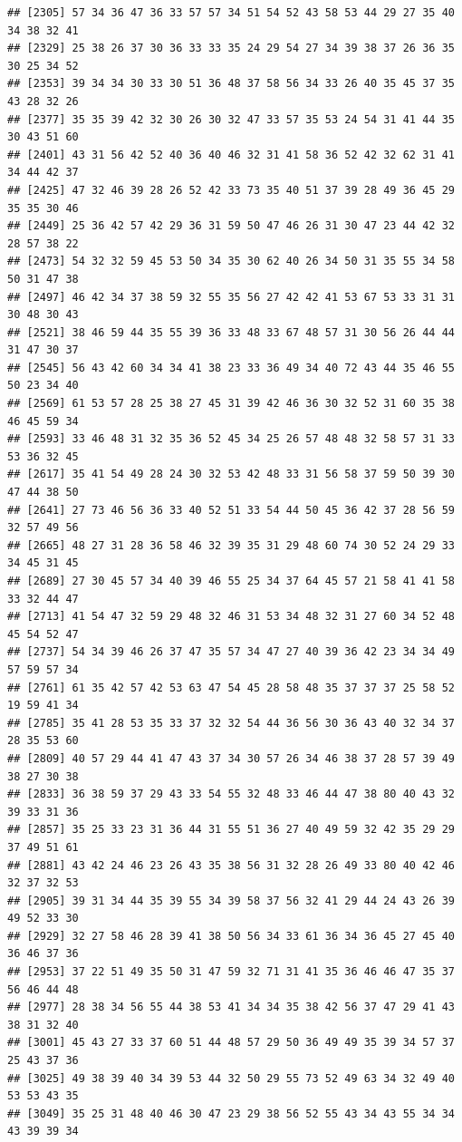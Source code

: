 \documentclass[
]{book}
\begin{document}
\begin{verbatim}
## [2305] 57 34 36 47 36 33 57 57 34 51 54 52 43 58 53 44 29 27 35 40 34 38 32 41
## [2329] 25 38 26 37 30 36 33 33 35 24 29 54 27 34 39 38 37 26 36 35 30 25 34 52
## [2353] 39 34 34 30 33 30 51 36 48 37 58 56 34 33 26 40 35 45 37 35 43 28 32 26
## [2377] 35 35 39 42 32 30 26 30 32 47 33 57 35 53 24 54 31 41 44 35 30 43 51 60
## [2401] 43 31 56 42 52 40 36 40 46 32 31 41 58 36 52 42 32 62 31 41 34 44 42 37
## [2425] 47 32 46 39 28 26 52 42 33 73 35 40 51 37 39 28 49 36 45 29 35 35 30 46
## [2449] 25 36 42 57 42 29 36 31 59 50 47 46 26 31 30 47 23 44 42 32 28 57 38 22
## [2473] 54 32 32 59 45 53 50 34 35 30 62 40 26 34 50 31 35 55 34 58 50 31 47 38
## [2497] 46 42 34 37 38 59 32 55 35 56 27 42 42 41 53 67 53 33 31 31 30 48 30 43
## [2521] 38 46 59 44 35 55 39 36 33 48 33 67 48 57 31 30 56 26 44 44 31 47 30 37
## [2545] 56 43 42 60 34 34 41 38 23 33 36 49 34 40 72 43 44 35 46 55 50 23 34 40
## [2569] 61 53 57 28 25 38 27 45 31 39 42 46 36 30 32 52 31 60 35 38 46 45 59 34
## [2593] 33 46 48 31 32 35 36 52 45 34 25 26 57 48 48 32 58 57 31 33 53 36 32 45
## [2617] 35 41 54 49 28 24 30 32 53 42 48 33 31 56 58 37 59 50 39 30 47 44 38 50
## [2641] 27 73 46 56 36 33 40 52 51 33 54 44 50 45 36 42 37 28 56 59 32 57 49 56
## [2665] 48 27 31 28 36 58 46 32 39 35 31 29 48 60 74 30 52 24 29 33 34 45 31 45
## [2689] 27 30 45 57 34 40 39 46 55 25 34 37 64 45 57 21 58 41 41 58 33 32 44 47
## [2713] 41 54 47 32 59 29 48 32 46 31 53 34 48 32 31 27 60 34 52 48 45 54 52 47
## [2737] 54 34 39 46 26 37 47 35 57 34 47 27 40 39 36 42 23 34 34 49 57 59 57 34
## [2761] 61 35 42 57 42 53 63 47 54 45 28 58 48 35 37 37 37 25 58 52 19 59 41 34
## [2785] 35 41 28 53 35 33 37 32 32 54 44 36 56 30 36 43 40 32 34 37 28 35 53 60
## [2809] 40 57 29 44 41 47 43 37 34 30 57 26 34 46 38 37 28 57 39 49 38 27 30 38
## [2833] 36 38 59 37 29 43 33 54 55 32 48 33 46 44 47 38 80 40 43 32 39 33 31 36
## [2857] 35 25 33 23 31 36 44 31 55 51 36 27 40 49 59 32 42 35 29 29 37 49 51 61
## [2881] 43 42 24 46 23 26 43 35 38 56 31 32 28 26 49 33 80 40 42 46 32 37 32 53
## [2905] 39 31 34 44 35 39 55 34 39 58 37 56 32 41 29 44 24 43 26 39 49 52 33 30
## [2929] 32 27 58 46 28 39 41 38 50 56 34 33 61 36 34 36 45 27 45 40 36 46 37 36
## [2953] 37 22 51 49 35 50 31 47 59 32 71 31 41 35 36 46 46 47 35 37 56 46 44 48
## [2977] 28 38 34 56 55 44 38 53 41 34 34 35 38 42 56 37 47 29 41 43 38 31 32 40
## [3001] 45 43 27 33 37 60 51 44 48 57 29 50 36 49 49 35 39 34 57 37 25 43 37 36
## [3025] 49 38 39 40 34 39 53 44 32 50 29 55 73 52 49 63 34 32 49 40 53 53 43 35
## [3049] 35 25 31 48 40 46 30 47 23 29 38 56 52 55 43 34 43 55 34 34 43 39 39 34

\end{verbatim}
\end{document}
